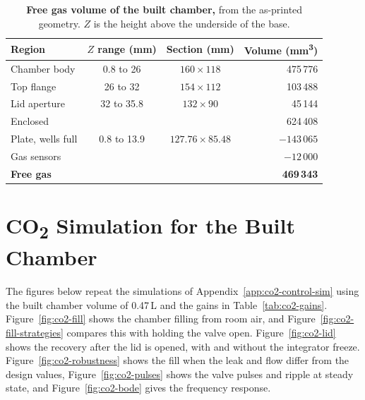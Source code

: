 \begin{table}[H]
    \centering
    \caption[Free gas volume of the built chamber]{\textbf{Free gas volume of the built chamber,} from the as-printed geometry. $Z$ is the height above the underside of the base.}
    \label{tab:co2-volume}
    \small
    \begin{tabular}{@{}lccr@{}}
        \toprule
        \textbf{Region} & \textbf{$Z$ range (mm)} & \textbf{Section (mm)} & \textbf{Volume (mm\textsuperscript{3})} \\
        \midrule
        Chamber body      & 0.8 to 26   & $160 \times 118$      & 475\,776 \\
        Top flange        & 26 to 32    & $154 \times 112$      & 103\,488 \\
        Lid aperture      & 32 to 35.8  & $132 \times 90$       & 45\,144 \\
        \midrule
        Enclosed          &             &                       & 624\,408 \\
        Plate, wells full & 0.8 to 13.9 & $127.76 \times 85.48$ & $-143\,065$ \\
        Gas sensors       &             &                       & $-12\,000$ \\
        \midrule
        \textbf{Free gas} &             &                       & \textbf{469\,343} \\
        \bottomrule
    \end{tabular}
\end{table}

\FloatBarrier
\section{CO\textsubscript{2} Simulation for the Built Chamber}
\label{app:co2-sim-built}

The figures below repeat the simulations of Appendix~\ref{app:co2-control-sim} using the built chamber volume of 0.47\,L and the gains in Table~\ref{tab:co2-gains}. Figure~\ref{fig:co2-fill} shows the chamber filling from room air, and Figure~\ref{fig:co2-fill-strategies} compares this with holding the valve open. Figure~\ref{fig:co2-lid} shows the recovery after the lid is opened, with and without the integrator freeze. Figure~\ref{fig:co2-robustness} shows the fill when the leak and flow differ from the design values, Figure~\ref{fig:co2-pulses} shows the valve pulses and ripple at steady state, and Figure~\ref{fig:co2-bode} gives the frequency response.

